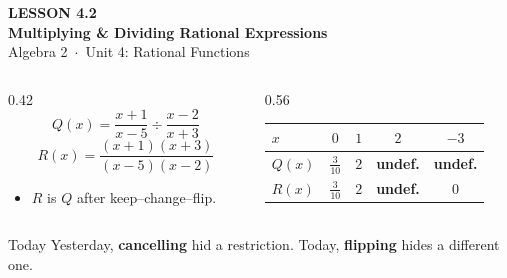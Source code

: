 \documentclass[aspectratio=169, 11pt]{beamer}
\begin{document}
{
\begin{frame}[plain]
  \vspace{2.8cm}\hspace{0.55cm}%
  \begin{minipage}{0.9\textwidth}
    {\color{goldacc}\bfseries\small LESSON 4.2}\\[0.5cm]
    {\color{white}\bfseries\LARGE Multiplying \& Dividing Rational Expressions}\\[1.2cm]
    {\color{forestmid}\small Algebra 2~$\cdot$~Unit 4: Rational Functions}
  \end{minipage}
\end{frame}
}

\begin{frame}[t, plain]
  \begin{columns}[T]
    \begin{column}{0.42\textwidth}
      \[ Q(x)=\frac{x+1}{x-5}\div\frac{x-2}{x+3} \]
      \[ R(x)=\frac{(x+1)(x+3)}{(x-5)(x-2)} \]
      \vspace{-8pt}
      \begin{itemize}\setlength{\itemsep}{4pt}
        \item $R$ is $Q$ after keep--change--flip.
      \end{itemize}
    \end{column}
    \begin{column}{0.56\textwidth}
      \centering
      \renewcommand{\arraystretch}{1.4}
      \begin{tabular}{|l|c|c|c|c|}
      \hline
      $x$ & $0$ & $1$ & $2$ & $-3$ \\ \hline
      $Q(x)$ & $\frac{3}{10}$ & $2$ & \textbf{undef.} & \textbf{undef.} \\ \hline
      $R(x)$ & $\frac{3}{10}$ & $2$ & \textbf{undef.} & $0$ \\ \hline
      \end{tabular}
    \end{column}
  \end{columns}
  \vspace{6pt}
  \begin{block}{Today}
    Yesterday, \textbf{cancelling} hid a restriction. Today, \textbf{flipping} hides a different one.
  \end{block}
\end{frame}
\end{document}
